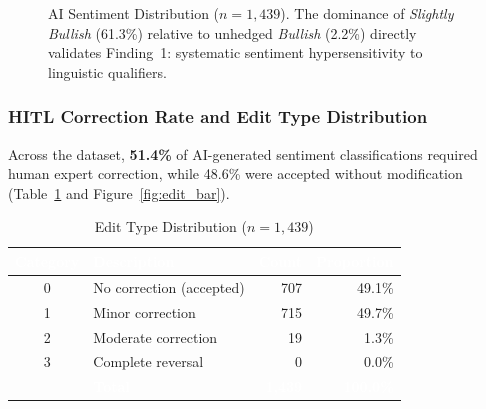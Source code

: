 \documentclass[11pt,a4paper]{article}
\begin{document}
\begin{figure}[H]
\centering
{}
\caption{AI Sentiment Distribution ($n = 1{,}439$). The dominance of \textit{Slightly Bullish}
(61.3\%) relative to unhedged \textit{Bullish} (2.2\%) directly validates Finding~1:
systematic sentiment hypersensitivity to linguistic qualifiers.}
\label{fig:sentiment_bar}
\end{figure}

\subsubsection{HITL Correction Rate and Edit Type Distribution}

Across the dataset, \textbf{51.4\%} of AI-generated sentiment classifications required
human expert correction, while 48.6\% were accepted without modification
(Table~\ref{tab:edit_types_dist} and Figure~\ref{fig:edit_bar}).

\begin{table}[H]
\centering
\caption{Edit Type Distribution ($n = 1{,}439$)}
\label{tab:edit_types_dist}
\renewcommand{\arraystretch}{1.3}
\begin{tabular}{clrr}
\toprule
\rowcolor{headerblue}
\textcolor{white}{\textbf{Category}} &
\textcolor{white}{\textbf{Description}} &
\textcolor{white}{\textbf{Count}} &
\textcolor{white}{\textbf{Proportion}} \\
\midrule
0 & No correction (accepted)  & 707 & 49.1\% \\
\rowcolor{rowgray}
1 & Minor correction          & 715 & 49.7\% \\
2 & Moderate correction       &  19 &  1.3\% \\
\rowcolor{rowgray}
3 & Complete reversal         &   0 &  0.0\% \\
\midrule
\rowcolor{headerblue}
  & \textcolor{white}{\textbf{Total}} &
    \textcolor{white}{\textbf{1,439}} &
    \textcolor{white}{\textbf{100.0\%}} \\
\bottomrule
\end{tabular}
\end{table}
\end{document}
